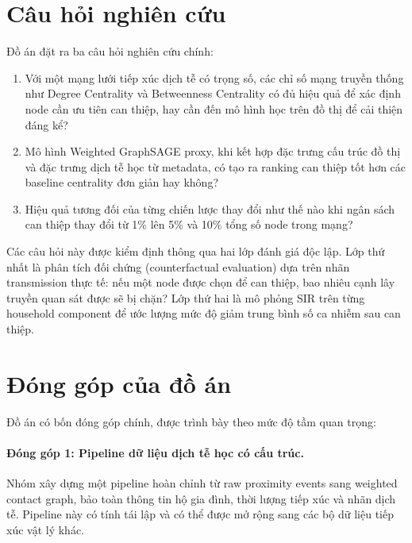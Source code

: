 \documentclass[12pt,a4paper]{report}
\theoremstyle{definition}
\begin{document}
\section{Câu hỏi nghiên cứu}

Đồ án đặt ra ba câu hỏi nghiên cứu chính:

\begin{enumerate}[label=\textbf{RQ\arabic*.}, leftmargin=2.0cm, itemsep=6pt]
    \item Với một mạng lưới tiếp xúc dịch tễ có trọng số, các chỉ số mạng truyền thống như Degree Centrality và Betweenness Centrality có đủ hiệu quả để xác định node cần ưu tiên can thiệp, hay cần đến mô hình học trên đồ thị để cải thiện đáng kể?

    \item Mô hình Weighted GraphSAGE proxy, khi kết hợp đặc trưng cấu trúc đồ thị và đặc trưng dịch tễ học từ metadata, có tạo ra ranking can thiệp tốt hơn các baseline centrality đơn giản hay không?

    \item Hiệu quả tương đối của từng chiến lược thay đổi như thế nào khi ngân sách can thiệp thay đổi từ 1\% lên 5\% và 10\% tổng số node trong mạng?
\end{enumerate}

Các câu hỏi này được kiểm định thông qua hai lớp đánh giá độc lập. Lớp thứ nhất là phân tích đối chứng (counterfactual evaluation) dựa trên nhãn transmission thực tế: nếu một node được chọn để can thiệp, bao nhiêu cạnh lây truyền quan sát được sẽ bị chặn? Lớp thứ hai là mô phỏng SIR trên từng household component để ước lượng mức độ giảm trung bình số ca nhiễm sau can thiệp.

\section{Đóng góp của đồ án}

Đồ án có bốn đóng góp chính, được trình bày theo mức độ tầm quan trọng:

\paragraph{Đóng góp 1: Pipeline dữ liệu dịch tễ học có cấu trúc.} Nhóm xây dựng một pipeline hoàn chỉnh từ raw proximity events sang weighted contact graph, bảo toàn thông tin hộ gia đình, thời lượng tiếp xúc và nhãn dịch tễ. Pipeline này có tính tái lập và có thể được mở rộng sang các bộ dữ liệu tiếp xúc vật lý khác.
\end{document}
